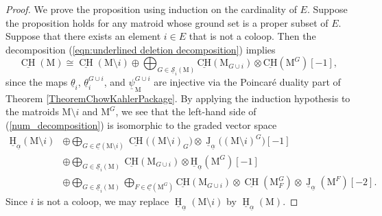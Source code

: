 \documentclass[11pt,reqno]{amsart}
\theoremstyle{definition}
\theoremstyle{remark}
\renewcommand{\H}{\operatorname{H}}
\renewcommand{\(}{\left(}
\renewcommand{\)}{\right)}
\newcommand{\<}{\left<}
\renewcommand{\>}{\right>}
\newcommand{\uJ}{\underline{\operatorname{J}}}
\newcommand{\CH}{\operatorname{CH}}
\newcommand{\uCH}{\underline{\CH}}
\begin{document}
\begin{proof}
We prove the proposition using induction on the cardinality of $E$. Suppose the proposition holds for any matroid whose ground set is a proper subset of $E$. Suppose that there exists an element $i\in E$ that is not a coloop. Then the decomposition (\ref{eqn:underlined deletion decomposition})
implies
\[
\underline{\CH}(\mathrm{M})\cong \uCH(\mathrm{M}\setminus i) \oplus \bigoplus_{G \in \underline{\mathscr{S}}_i(\mathrm{M})} \underline{\mathrm{CH}}(\mathrm{M}_{G\cup i}) \otimes  \underline{\mathrm{CH}}(\mathrm{M}^{G})[-1],
\]
since the maps $\underline{\theta}_i$, $\underline{\theta}_i^{G\cup i}$, and $\underline{\psi}_{\mathrm{M}}^{G\cup i}$ are injective via the Poincar\'{e} duality part of Theorem \ref{TheoremChowKahlerPackage}.
By applying the induction hypothesis to the matroids $\mathrm{M}\setminus i$ and $\mathrm{M}^G$, we see that 
the left-hand side of (\ref{num_decomposition}) is isomorphic to the graded vector space
\begin{align*}
\underline{\mathrm{H}}_{\underline{\alpha}}(\mathrm{M}\setminus i) & \oplus  \bigoplus_{G\in \underline{\mathscr{C}}({\mathrm{M}\setminus i})}   \uCH\big((\mathrm{M}\setminus i)_G\big)\otimes \uJ_{\underline{\alpha}}\big((\mathrm{M}\setminus i)^G\big)[-1]\\
&\oplus   \bigoplus_{G \in \underline{\mathscr{S}}_i({\mathrm{M}})} \ \underline{\mathrm{CH}}(\mathrm{M}_{G\cup i}) \otimes \underline{\mathrm{H}}_{\underline{\alpha}}(\mathrm{M}^G)[-1] \\ &\oplus    \bigoplus_{G \in \underline{\mathscr{S}}_i({\mathrm{M}})}   \bigoplus_{F\in \underline{\mathscr{C}}({\mathrm{M}^G})}  \underline{\mathrm{CH}}(\mathrm{M}_{G\cup i}) \otimes  \uCH(\mathrm{M}^G_F)\otimes \uJ_{\underline{\alpha}}(\mathrm{M}^F)[-2].
\end{align*}
Since $i$ is not a coloop, we may replace
 $ \underline{\H}_{\underline\alpha}(\mathrm{M}\setminus i)$  by
  $\underline{\H}_{\underline\alpha}(\mathrm{M})$.


\end{proof}
\end{document}
